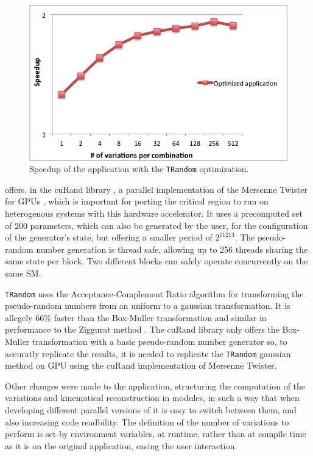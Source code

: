 \begin{figure}[!htp]
	\begin{center}
		\includegraphics[scale=0.7]{../../common/graphs/speedup_trandom_optim.png}  
		\caption{Speedup of the \tth application with the \texttt{TRandom} optimization.}
		\label{fig:TRandomOptim}
	\end{center}
\end{figure}

\nvidia offers, in the cuRand library \cite{NVIDIA:cuRand}, a parallel implementation of the Mersenne Twister for GPUs \cite{NVIDIA:MersenneTwister}, which is important for porting the critical region to run on heterogenous systems with this hardware accelerator. It uses a precomputed set of 200 parameters, which can also be generated by the user, for the configuration of the generator's state, but offering a smaller period of $2^{11213}$. The pseudo-random number generation is thread safe, allowing up to 256 threads sharing the same state per block. Two different blocks can safely operate concurrently on the same SM.

\texttt{TRandom} uses the Acceptance-Complement Ratio algorithm \cite{AcceptanceRandom} for transforming the pseudo-random numbers from an uniform to a gaussian transformation. It is allegely 66\% faster than the Box-Muller transformation \cite{BoxMuller} and similar in performance to the Ziggurat method \cite{Ziggurat}. The cuRand library only offers the Box-Muller transformation with a basic pseudo-random number generator so, to accuratly replicate the results, it is needed to replicate the \texttt{TRandom} gaussian method on GPU using the cuRand implementation of Mersenne Twister.

Other changes were made to the application, structuring the computation of the variations and kinematical reconstruction in modules, in such a way that when developing different parallel versions of \ttDilepKinFit it is easy to switch between them, and also increasing code readbility. The definition of the number of variations to perform is set by environment variables, at runtime, rather than at compile time as it is on the original application, easing the user interaction.
